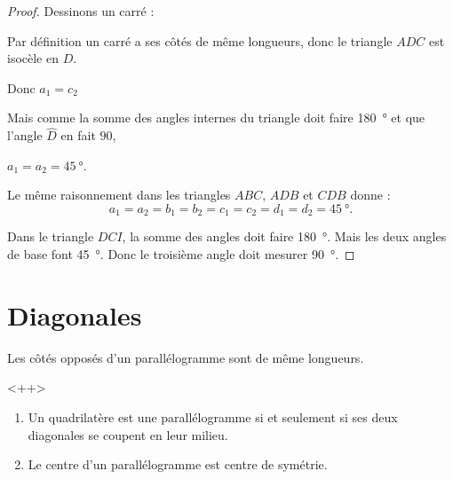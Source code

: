 \begin{proof}
    Dessinons un carré :
    \begin{center}
        
    \end{center}
    Par définition un carré a ses côtés de même longueurs, donc le triangle \( ADC\) est isocèle en \( D\).
    \begin{center}
        Donc \( a_1=c_2\)
    \end{center}
    Mais comme la somme des angles internes du triangle doit faire \SI{180}{\degree} et que l'angle \( \hat D\) en fait \( 90\), 
    \begin{center}
        \( a_1=a_2=\SI{45}{\degree}\).
    \end{center}
    Le même raisonnement dans les triangles \( ABC\), \( ADB\) et \( CDB\) donne :
    \begin{equation}
        a_1=a_2=b_1=b_2=c_1=c_2=d_1=d_2=\SI{45}{\degree}.
    \end{equation}
    
    Dans le triangle \( DCI\), la somme des angles doit faire \SI{180}{\degree}. Mais les deux angles de base font \SI{45}{\degree}. Donc le troisième angle doit mesurer \SI{90}{\degree}.

\end{proof}




\section{Diagonales}

\begin{propriete}
    Les côtés opposés d'un parallélogramme sont de même longueurs.
\end{propriete}
<++>

\begin{propriete}
    \begin{enumerate}
        \item
            Un quadrilatère est une parallélogramme si et seulement si ses deux diagonales se coupent en leur milieu.
        \item
            Le centre d'un parallélogramme est centre de symétrie.
    \end{enumerate}
\end{propriete}

